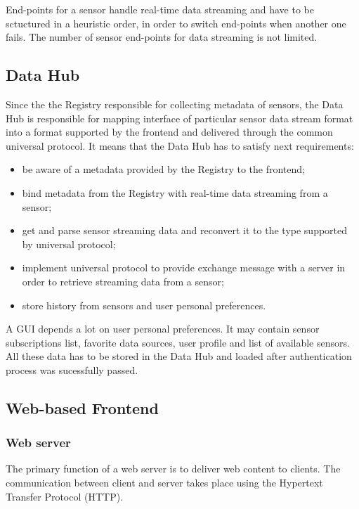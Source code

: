     End-points for a sensor handle real-time data streaming and have to be sctuctured in a heuristic order, in order to switch end-points when another one fails. The number of sensor end-points for data streaming is not limited.

  \subsection{Data Hub}
    Since the the Registry responsible for collecting metadata of sensors, the Data Hub is responsible for mapping interface of particular sensor data stream format into a format supported by the frontend and delivered through the common universal protocol. It means that the Data Hub has to satisfy next requirements:

    \begin{itemize}
    \item be aware of a metadata provided by the Registry to the frontend;
    \item bind metadata from the Registry with real-time data streaming from a sensor;
    \item get and parse sensor streaming data and reconvert it to the type supported by universal protocol;
    \item implement universal protocol to provide exchange message with a server in order to retrieve streaming data from a sensor;
    \item store history from sensors and user personal preferences.
    \end{itemize}
    
    A GUI depends a lot on user personal preferences. It may contain sensor subscriptions list, favorite data sources, user profile and list of available sensors. All these data has to be stored in the Data Hub and loaded after authentication process was sucessfully passed.

  \subsection{Web-based Frontend}
  \label{section:web-frontend}
    \subsubsection{Web server}
    The primary function of a web server is to deliver web content to clients. The communication between client and server takes place using the Hypertext Transfer Protocol (HTTP).

